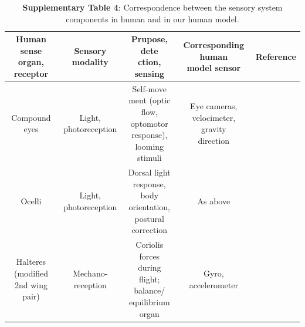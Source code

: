\documentclass[sn-mathphys-num]{sn-jnl}%
\theoremstyle{thmstyleone}%
\theoremstyle{thmstyletwo}%
\theoremstyle{thmstylethree}%
\begin{document}
\begin{appendices}
\begin{table}[htbp]
	\centering
	\small
	\caption{\textbf{Supplementary Table 4}: 
		Correspondence between the sensory system components in human and in our human model.}
	\begin{tabular}{ccccc}
		\toprule
		\makecell{Human sense\\organ, receptor}         &        Sensory modality  & \makecell{Prupose, dete\\ction, sensing}  & \makecell{Corresponding human\\ model sensor}  & Reference \\
		\midrule
		Compound eyes     &   \makecell{Light,\\ photoreception}      &    \makecell{Self-move\\ment (optic \\flow, \\optomotor \\response), \\looming \\stimuli} & \makecell{Eye cameras, \\ velocimeter, \\ gravity \\ direction} & \cite{hengstenberg1993multisensory,strausfeld1985convergence} \\
		\midrule
		Ocelli     &   \makecell{Light,\\ photoreception}      &    \makecell{Dorsal light\\ response,\\ body\\ orientation,\\ postural \\ correction} & As above & \cite{hengstenberg1993multisensory,strausfeld1985convergence,mimura1970convergence} \\
		\midrule
		\makecell{Halteres \\(modified \\2nd wing pair)}     &   \makecell{Mechano-\\reception}      &   \makecell{Coriolis \\forces during\\ flight; \\balance/\\equilibrium \\organ} & \makecell{Gyro, \\accelerometer} & \cite{strausfeld1985convergence,fayyazuddin1996haltere} \\

\end{tabular}
\end{table}
\end{appendices}
\end{document}
